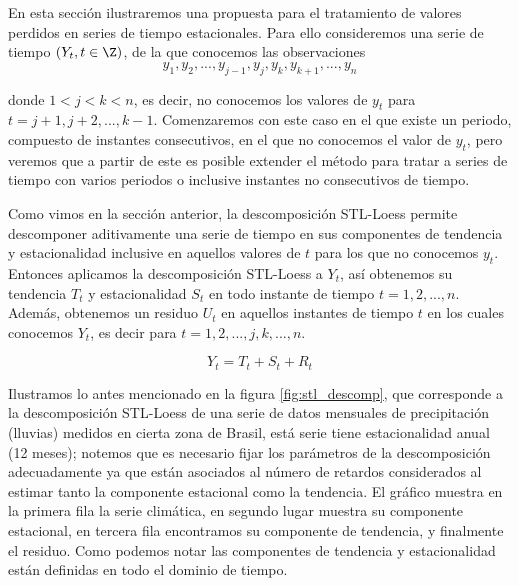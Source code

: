 \documentclass[12pt,oneside]{book}\usepackage[]{graphicx}\usepackage[]{color}
\theoremstyle{definition} %
\begin{document}
En esta sección ilustraremos una propuesta para el tratamiento de valores perdidos en series de tiempo estacionales. Para ello consideremos una serie de tiempo $(Y_t,t\in \Z)$, de la que conocemos las observaciones 
$$y_1,y_2,...,y_{j-1}, y_j, y_k, y_{k+1},...,y_n$$

donde $1 < j < k < n$, es decir, no conocemos los valores de $y_t$ para $t=j+1, j+2, ..., k-1$. Comenzaremos con este caso en el que existe un periodo, compuesto de instantes consecutivos, en el que no conocemos el valor de $y_t$, pero veremos que a partir de este es posible extender el método para tratar a series de tiempo con varios periodos o inclusive instantes no consecutivos de tiempo.

Como vimos en la sección anterior, la descomposición STL-Loess permite descomponer aditivamente una serie de tiempo en sus componentes de tendencia y estacionalidad inclusive en aquellos valores de $t$ para los que no conocemos $y_t$. Entonces aplicamos la descomposición STL-Loess a $Y_t$, así obtenemos su tendencia $T_t$ y estacionalidad $S_t$ en todo instante de tiempo $t=1,2,...,n$. Además, obtenemos un residuo $U_t$ en aquellos instantes de tiempo $t$ en los cuales conocemos $Y_t$, es decir para $t=1,2,...,j,k,...,n$.


\begin{equation}
\label{eq:stl_descomp}
Y_t = T_t + S_t + R_t
\end{equation}

Ilustramos lo antes mencionado en la figura \ref{fig:stl_descomp}, que corresponde a la descomposición STL-Loess de una serie de datos mensuales de precipitación (lluvias) medidos en cierta zona de Brasil, está serie tiene estacionalidad anual (12 meses); notemos que es necesario fijar los parámetros de la descomposición adecuadamente ya que están asociados al número de retardos considerados al estimar tanto la componente estacional como la tendencia. El gráfico muestra en la primera fila la serie climática, en segundo lugar muestra su componente estacional, en tercera fila encontramos su componente de tendencia, y finalmente el residuo. Como podemos notar las componentes de tendencia y estacionalidad están definidas en todo el dominio de tiempo.
\end{document}
